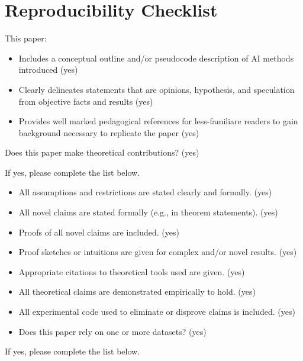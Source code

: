 \newpage
\section*{Reproducibility Checklist}

This paper:
\begin{itemize}
\item Includes a conceptual outline and/or pseudocode description of AI methods introduced (yes)
\item Clearly delineates statements that are opinions, hypothesis, and speculation from objective facts and results (yes)
\item Provides well marked pedagogical references for less-familiare readers to gain background necessary to replicate the paper (yes)
\end{itemize}

Does this paper make theoretical contributions? (yes)

If yes, please complete the list below.
\begin{itemize}
\item All assumptions and restrictions are stated clearly and formally. (yes)
\item All novel claims are stated formally (e.g., in theorem statements). (yes)
\item Proofs of all novel claims are included. (yes)
\item Proof sketches or intuitions are given for complex and/or novel results. (yes)
\item Appropriate citations to theoretical tools used are given. (yes)
\item All theoretical claims are demonstrated empirically to hold. (yes)
\item All experimental code used to eliminate or disprove claims is included. (yes)
\item Does this paper rely on one or more datasets? (yes)
\end{itemize}

If yes, please complete the list below.

